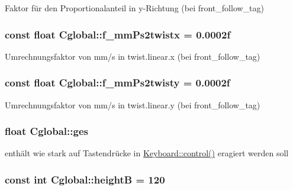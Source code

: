 Faktor für den Proportionalanteil in y-\/Richtung (bei front\_\-follow\_\-tag) 

\hypertarget{class_cglobal_a4f723543ed33fd4a3130199a6a49f8de}{
\subsubsection[{f\_\-mmPs2twistx}]{\setlength{\rightskip}{0pt plus 5cm}const float {\bf Cglobal::f\_\-mmPs2twistx} = 0.0002f}}
\label{class_cglobal_a4f723543ed33fd4a3130199a6a49f8de}


Umrechnungsfaktor von mm/s in twist.linear.x (bei front\_\-follow\_\-tag) 

\hypertarget{class_cglobal_abeca26e674667f54df37cec645067854}{
\subsubsection[{f\_\-mmPs2twisty}]{\setlength{\rightskip}{0pt plus 5cm}const float {\bf Cglobal::f\_\-mmPs2twisty} = 0.0002f}}
\label{class_cglobal_abeca26e674667f54df37cec645067854}


Umrechnungsfaktor von mm/s in twist.linear.y (bei front\_\-follow\_\-tag) 

\hypertarget{class_cglobal_a478c0d94a8f8a7675d3e88e85742c81a}{
\subsubsection[{ges}]{\setlength{\rightskip}{0pt plus 5cm}float {\bf Cglobal::ges}}}
\label{class_cglobal_a478c0d94a8f8a7675d3e88e85742c81a}


enthält wie stark auf Tastendrücke in \hyperlink{namespace_keyboard_abfb3168172d115a6516147c6d42f58db}{Keyboard::control()} eragiert werden soll 

\hypertarget{class_cglobal_ade7cccb8bca50ca0e4740a4cecfb7498}{
\subsubsection[{heightB}]{\setlength{\rightskip}{0pt plus 5cm}const int {\bf Cglobal::heightB} = 120}}
\label{class_cglobal_ade7cccb8bca50ca0e4740a4cecfb7498}


